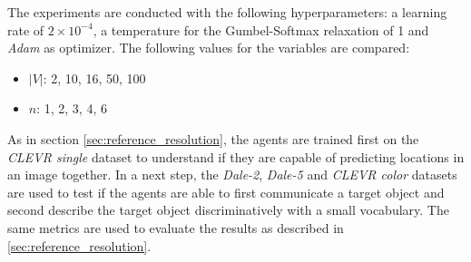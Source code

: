 The experiments are conducted with the following hyperparameters: a learning rate of $2\times10^{-4}$, a temperature for the Gumbel-Softmax relaxation of 1 and \emph{Adam} \citep{Kingma2015} as optimizer.
The following values for the variables are compared:
\begin{itemize}
    \item $|V|$: 2, 10, 16, 50, 100
    \item $n$: 1, 2, 3, 4,  6
\end{itemize}

As in section \ref{sec:reference_resolution}, the agents are trained first on the \emph{CLEVR single} dataset to understand if they are capable of predicting locations in an image together.
In a next step, the \emph{Dale-2}, \emph{Dale-5} and \emph{CLEVR color} datasets are used to test if the agents are able to first communicate a target object and second describe the target object discriminatively with a small vocabulary.
The same metrics are used to evaluate the results as described in \ref{sec:reference_resolution}.

